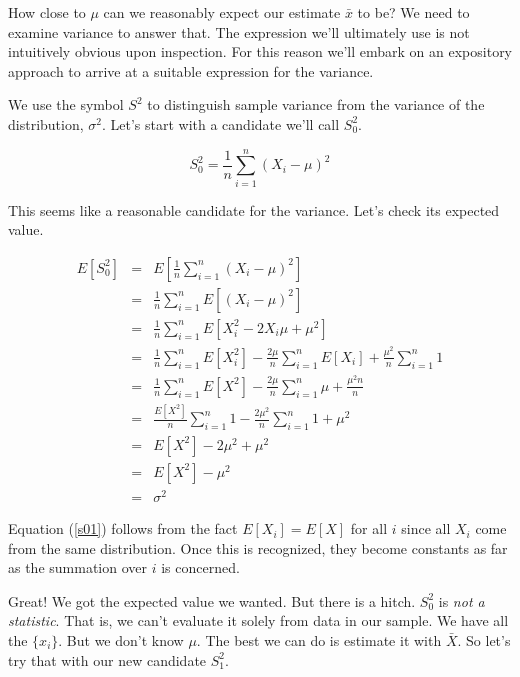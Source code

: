 \documentclass[]{article}
\begin{document}
How close to $\mu$ can we reasonably expect our estimate $\bar{x}$ to be?
We need to examine variance to answer that.  The expression we'll ultimately
use is not intuitively obvious upon inspection.  For this reason we'll
embark on an expository approach to arrive at a suitable expression
for the variance.

We use the symbol $S^2$ to distinguish sample variance from the
variance of the distribution, $\sigma^2$.  Let's start with a
candidate we'll call $S_0^2$.

\begin{equation} \label{s0}
S_0^2 = \frac{1}{n} \sum_{i=1}^n (X_i - \mu)^2
\end{equation}

This seems like a reasonable candidate for the variance.  Let's
check its expected value.

\begin{eqnarray}
E\left[ S_0^2 \right] &= &E \left[ \frac{1}{n} \sum_{i=1}^n 
         (X_i - \mu)^2\right] \nonumber \\
  &= &\frac{1}{n} \sum_{i=1}^n E \left[ (X_i - \mu)^2 \right] \nonumber \\
  &= &\frac{1}{n} \sum_{i=1}^n E \left[ X_i^2 - 2 X_i \mu + \mu^2 \right] \nonumber \\ 
  &= &\frac{1}{n} \sum_{i=1}^n E \left[ X_i^2 \right] -
      \frac{2 \mu}{n} \sum_{i=1}^n E [ X_i ] + 
      \frac{\mu^2}{n} \sum_{i=1}^n 1 \nonumber \\
  &= &\frac{1}{n} \sum_{i=1}^n E \left[ X^2 \right] -
      \frac{2 \mu}{n} \sum_{i=1}^n \mu + 
      \frac{\mu^2 n}{n}  \label{s01}   \\
  &= &\frac{E \left[ X^2 \right] }{n} \sum_{i=1}^n 1 - 
      \frac{2 \mu^2}{n} \sum_{i=1}^n 1 + \mu^2  \nonumber \\
  &= &E \left[ X^2 \right] -  2 \mu^2 + \mu^2  \nonumber \\
  &= &E \left[ X^2 \right] -  \mu^2  \nonumber  \\
  &= &\sigma^2  \nonumber
\end{eqnarray}

Equation (\ref{s01}) follows from the fact $E[X_i] = E[X]$ 
for all $i$ since
all $X_i$ come from the same distribution.  Once this is recognized,
they become constants as far as the summation over $i$ is concerned.

Great!  We got the expected value we wanted.  But there is a hitch.
$S_0^2$ is \emph{not a statistic}.  That is, we can't evaluate it
solely from data in our sample.  We have all the $\{x_i\}$.  But
we don't know $\mu$.  The best we can do is estimate it with
$\bar{X}$.  So let's try that with our new candidate $S_1^2$.
\end{document}
